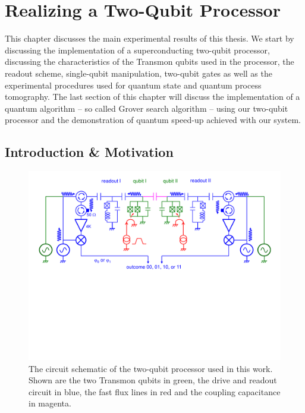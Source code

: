 
\chapter{Realizing a Two-Qubit Processor}

This chapter discusses the main experimental results of this thesis. We start by discussing the implementation of a superconducting two-qubit processor, discussing the characteristics of the Transmon qubits used in the processor, the readout scheme, single-qubit manipulation, two-qubit gates as well as the experimental procedures used for quantum state and quantum process tomography. The last section of this chapter will discuss the implementation of a quantum algorithm -- so called Grover search algorithm -- using our two-qubit processor and the demonstration of quantum speed-up achieved with our system.


\section{Introduction \& Motivation}

\begin{figure}[ht!]
  \centering
	\includegraphics[width=1.\textwidth]{"./material/figures/2-qubit-processor/processor schematic"}
	\caption[Circuit schematic of the two-qubit processor]{The circuit schematic of the two-qubit processor used in this work. Shown are the two Transmon qubits in green, the drive and readout circuit in blue, the fast flux lines in red and the coupling capacitance in magenta.}
	\label{fig:2_qubit_chip_circuit_diagram}
\end{figure}

